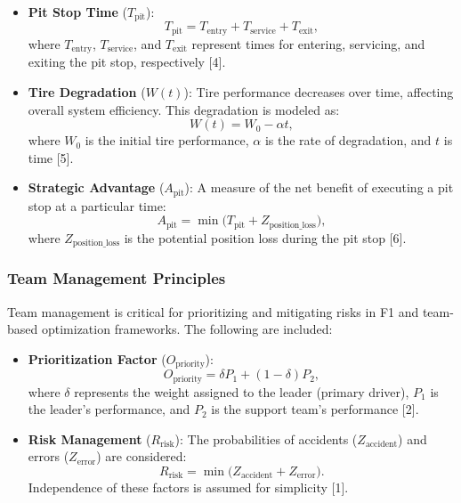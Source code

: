 \documentclass[preprint,12pt]{elsarticle}
\begin{document}
\begin{itemize}
    \item \textbf{Pit Stop Time} (\( T_{\text{pit}} \)): 
    \begin{equation}
    T_{\text{pit}} = T_{\text{entry}} + T_{\text{service}} + T_{\text{exit}},
    \end{equation}
    where \( T_{\text{entry}} \), \( T_{\text{service}} \), and \( T_{\text{exit}} \) represent times for entering, servicing, and exiting the pit stop, respectively [4].
    
    \item \textbf{Tire Degradation} (\( W(t) \)): Tire performance decreases over time, affecting overall system efficiency. This degradation is modeled as:
    \begin{equation}
    W(t) = W_0 - \alpha t,
    \end{equation}
    where \( W_0 \) is the initial tire performance, \( \alpha \) is the rate of degradation, and \( t \) is time [5].
    
    \item \textbf{Strategic Advantage} (\( A_{\text{pit}} \)): A measure of the net benefit of executing a pit stop at a particular time:
    \begin{equation}
    A_{\text{pit}} = \min \bigl(T_{\text{pit}} + Z_{\text{position\_loss}}\bigr),
    \end{equation}
    where \( Z_{\text{position\_loss}} \) is the potential position loss during the pit stop [6].
\end{itemize}

\subsubsection{Team Management Principles}

Team management is critical for prioritizing and mitigating risks in F1 and team-based optimization frameworks. The following are included:

\begin{itemize}
    \item \textbf{Prioritization Factor} (\( O_{\text{priority}} \)):
    \begin{equation}
    O_{\text{priority}} = \delta P_1 + (1 - \delta) P_2,
    \end{equation}
    where \( \delta \) represents the weight assigned to the leader (primary driver), \( P_1 \) is the leader’s performance, and \( P_2 \) is the support team’s performance [2].
    
    \item \textbf{Risk Management} (\( R_{\text{risk}} \)): The probabilities of accidents (\(Z_{\text{accident}}\)) and errors (\(Z_{\text{error}}\)) are considered:
    \begin{equation}
    R_{\text{risk}} = \min \bigl(Z_{\text{accident}} + Z_{\text{error}}\bigr).
    \end{equation}
    Independence of these factors is assumed for simplicity [1].
\end{itemize}
\end{document}
